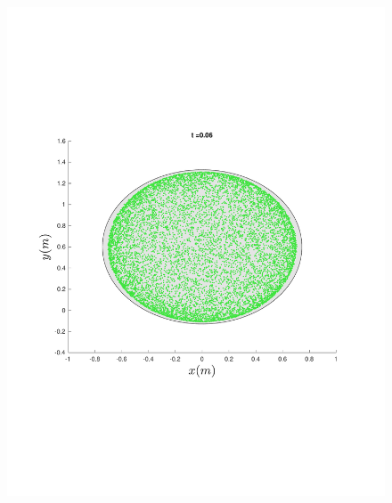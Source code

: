 \begin{figure}
{\begin{minipage}{0.5\textwidth}
\begin{minipage}[b]{0.5\textwidth}
        \includegraphics[width=\textwidth]{figures/method/FunnelSimOverlaid9funnel-1}
      \end{minipage}%
      \\
      \begin{minipage}[b]{0.5\textwidth}

\end{minipage}
\end{minipage}}
\end{figure}
